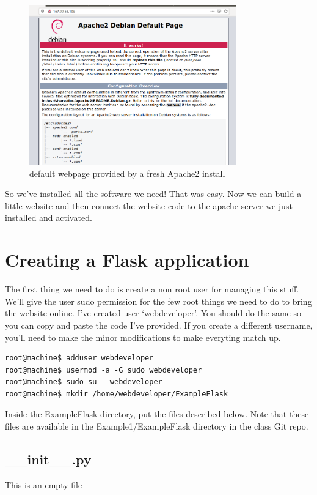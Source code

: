 \documentclass[10pt]{article}
\begin{document}
\begin{figure}[h]
  \centering
    \includegraphics[width=0.8\textwidth]{defaultApache.png}
  \caption{default webpage provided by a fresh Apache2 install}
\end{figure}

So we've installed all the software we need! That was easy. Now we can build a little website and then connect the website code to the apache server we just installed and activated.

\section{Creating a Flask application}
The first thing we need to do is create a non root user for managing this stuff. We'll give the user sudo permission for the few root things we need to do to bring the website online. I've created user `webdeveloper'. You should do the same so you can copy and paste the code I've provided. If you create a different username, you'll need to make the minor modifications to make everyting match up.

\begin{lstlisting}
root@machine$ adduser webdeveloper
root@machine$ usermod -a -G sudo webdeveloper
root@machine$ sudo su - webdeveloper
root@machine$ mkdir /home/webdeveloper/ExampleFlask
\end{lstlisting}

Inside the ExampleFlask directory, put the files described below. Note that these files are available in the Example1/ExampleFlask directory in the class Git repo.

\subsection{\_\_init\_\_.py}
This is an empty file
\end{document}
